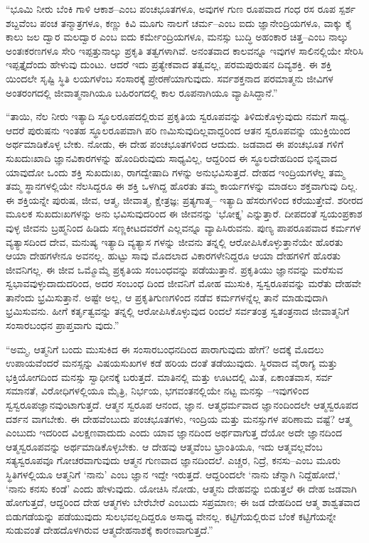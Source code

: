 “ಭೂಮಿ ನೀರು ಬೆಂಕಿ ಗಾಳಿ ಆಕಾಶ–ಎಂಬ ಪಂಚಭೂತಗಳೂ, ಅವುಗಳ ಗುಣ ರೂಪವಾದ ಗಂಧ ರಸ ರೂಪ ಸ್ಪರ್ಶ ಶಬ್ದವೆಂಬ ಪಂಚ ತನ್ಮಾತ್ರಗಳೂ, ಕಣ್ಣು ಕಿವಿ ಮೂಗು ನಾಲಗೆ ಚರ್ಮ–ಎಂಬ ಐದು ಜ್ಞಾನೇಂದ್ರಿಯಗಳೂ, ವಾಕ್ಕು ಕೈ ಕಾಲು ಜಲ ದ್ವಾರ ಮಲದ್ವಾರ ಎಂಬ ಐದು ಕರ್ಮೇಂದ್ರಿಯಗಳೂ, ಮನಸ್ಸು ಬುದ್ಧಿ ಅಹಂಕಾರ ಚಿತ್ತ–ಎಂಬ ನಾಲ್ಕು ಅಂತಃಕರಣಗಳೂ ಸೇರಿ ಇಪ್ಪತ್ತುನಾಲ್ಕು ಪ್ರಕೃತಿ ತತ್ವಗಳಾಗಿವೆ. ಅನಂತವಾದ ಕಾಲವನ್ನೂ ಇವುಗಳ ಸಾಲಿನಲ್ಲಿಯೇ ಸೇರಿಸಿ ಇಪ್ಪತ್ತೈದೆಂದು ಹೇಳುವು ದುಂಟು. ಆದರೆ ಇದು ಪ್ರತ್ಯೇಕವಾದ ತತ್ವವಲ್ಲ, ಪರಮಪುರುಷನ ದಿವ್ಯಶಕ್ತಿ. ಈ ಶಕ್ತಿ ಯಿಂದಲೇ ಸೃಷ್ಟಿ ಸ್ಥಿತಿ ಲಯಗಳೆಂಬ ಸಂಸಾರಕ್ಕೆ ಪ್ರೇರಣೆಯಾಗುವುದು. ಸರ್ವಶಕ್ತನಾದ ಪರಮಾತ್ಮನು ಜೀವಿಗಳ ಅಂತರಂಗದಲ್ಲಿ ಜೀವಾತ್ಮನಾಗಿಯೂ ಬಹಿರಂಗದಲ್ಲಿ ಕಾಲ ರೂಪನಾಗಿಯೂ ವ್ಯಾಪಿಸಿದ್ದಾನೆ.”

“ತಾಯಿ, ನೆಲ ನೀರು ಇತ್ಯಾದಿ ಸ್ಥೂಲರೂಪದಲ್ಲಿರುವ ಪ್ರಕೃತಿಯ ಸ್ವರೂಪವನ್ನು ತಿಳಿದುಕೊಳ್ಳುವುದು ನಮಗೆ ಸಾಧ್ಯ. ಆದರೆ ಪುರುಷನು ಇಂತಹ ಸ್ಥೂಲರೂಪವಾಗಿ ಪರಿ ಣಮಿಸುವುದಿಲ್ಲವಾದ್ದರಿಂದ ಆತನ ಸ್ವರೂಪವನ್ನು ಯುಕ್ತಿಯಿಂದ ಅರ್ಥಮಾಡಿಕೊಳ್ಳ ಬೇಕು. ನೋಡು, ಈ ದೇಹ ಪಂಚಭೂತಗಳಿಂದ ಆದುದು. ಜಡವಾದ ಈ ಪಂಚಭೂತ ಗಳಿಗೆ ಸುಖದುಃಖಾದಿ ಜ್ಞಾನವಿಕಾರಗಳನ್ನು ಹೊಂದಿರುವುದು ಸಾಧ್ಯವಿಲ್ಲ, ಆದ್ದರಿಂದ ಈ ಸ್ಥೂಲದೇಹದಿಂದ ಭಿನ್ನವಾದ ಯಾವುದೋ ಒಂದು ಶಕ್ತಿ ಸುಖದುಃಖ, ರಾಗದ್ವೇಷಾದಿ ಗಳನ್ನು ಅನುಭವಿಸುತ್ತದೆ. ದೇಹದ ಇಂದ್ರಿಯಗಳೆಲ್ಲ ತಮ್ಮ ತಮ್ಮ ಸ್ಥಾನಗಳಲ್ಲಿಯೇ ನೆಲಸಿದ್ದರೂ ಈ ಶಕ್ತಿ ಒಳಗಿದ್ದ ಹೊರತು ತಮ್ಮ ಕಾರ್ಯಗಳನ್ನು ಮಾಡಲು ಶಕ್ತವಾಗುವು ದಿಲ್ಲ. ಈ ಶಕ್ತಿಯನ್ನೇ ಪುರುಷ, ಜೀವ, ಆತ್ಮ, ಜೀವಾತ್ಮ, ಕ್ಷೇತ್ರಜ್ಞ; ಪ್ರತ್ಯಗಾತ್ಮ– ಇತ್ಯಾದಿ ಹೆಸರುಗಳಿಂದ ಕರೆಯುತ್ತೇವೆ. ಶರೀರದ ಮೂಲಕ ಸುಖದುಃಖಗಳನ್ನು ಅನು ಭವಿಸುವುದರಿಂದ ಈ ಜೀವನನ್ನು ‘ಭೋಕ್ತೃ’ ಎನ್ನುತ್ತಾರೆ. ದೀಪದಂತೆ ಸ್ವಯಂಪ್ರಕಾಶ ವುಳ್ಳ ಜೀವನು ಬ್ರಹ್ಮನಿಂದ ಹಿಡಿದು ಸಣ್ಣಕೀಟದವರೆಗೆ ಎಲ್ಲವನ್ನೂ ವ್ಯಾಪಿಸಿರುವನು. ಪುಣ್ಯ ಪಾಪರೂಪವಾದ ಕರ್ಮಗಳ ವ್ಯತ್ಯಾಸದಿಂದ ದೇವ, ಮನುಷ್ಯ ಇತ್ಯಾದಿ ವ್ಯತ್ಯಾಸ ಗಳನ್ನು ಜೀವನು ತನ್ನಲ್ಲಿ ಆರೋಪಿಸಿಕೊಳ್ಳುತ್ತಾನೆಯೇ ಹೊರತು ಆಯಾ ದೇಹಗಳೇನೂ ಅವನಲ್ಲ. ಹುಟ್ಟು ಸಾವು ಮೊದಲಾದ ವಿಕಾರಗಳೇನಿದ್ದರೂ ಆಯಾ ದೇಹಗಳಿಗೆ ಹೊರತು ಜೀವನಿಗಲ್ಲ. ಈ ಜೀವ ಒಮ್ಮೊಮ್ಮೆ ಪ್ರಕೃತಿಯ ಸಂಬಂಧವನ್ನು ಪಡೆಯುತ್ತಾನೆ. ಪ್ರಕೃತಿಯು ಜ್ಞಾನವನ್ನು ಮರೆಸುವ ಸ್ವಭಾವವುಳ್ಳುದಾದುದರಿಂದ, ಅದರ ಸಂಬಂಧ ದಿಂದ ಜೀವನಿಗೆ ಮೋಹ ಮುಸುಕಿ, ಸ್ವಸ್ವರೂಪವನ್ನು ಮರೆತು ದೇಹವೇ ತಾನೆಂದು ಭ್ರಮಿಸುತ್ತಾನೆ. ಅಷ್ಟೇ ಅಲ್ಲ, ಆ ಪ್ರಕೃತಿಗುಣಗಳಿಂದ ನಡೆವ ಕರ್ಮಗಳನ್ನೆಲ್ಲ ತಾನೆ ಮಾಡುವುದಾಗಿ ಭ್ರಮಿಸುವನು. ಹೀಗೆ ಕರ್ತೃತ್ವವನ್ನು ತನ್ನಲ್ಲಿ ಆರೋಪಿಸಿಕೊಳ್ಳುವುದ ರಿಂದಲೆ ಸರ್ವತಂತ್ರ ಸ್ವತಂತ್ರನಾದ ಜೀವಾತ್ಮನಿಗೆ ಸಂಸಾರಬಂಧನ ಪ್ರಾಪ್ತವಾಗು ವುದು.”

“ಅಮ್ಮ, ಆತ್ಮನಿಗೆ ಬಂದು ಮುಸುಕಿದ ಈ ಸಂಸಾರಬಂಧನದಿಂದ ಪಾರಾಗುವುದು ಹೇಗೆ? ಅದಕ್ಕೆ ಮೊದಲು ಉಪಾಯವೆಂದರೆ ಮನಸ್ಸನ್ನು ವಿಷಯಸುಖಗಳ ಕಡೆ ಹರಿಯ ದಂತೆ ತಡೆಯುವುದು. ಸ್ಥಿರವಾದ ವೈರಾಗ್ಯ ಮತ್ತು ಭಕ್ತಿಯೋಗದಿಂದ ಮನಸ್ಸು ಸ್ವಾಧೀನಕ್ಕೆ ಬರುತ್ತದೆ. ಮಾತಿನಲ್ಲಿ ಮತ್ತು ಊಟದಲ್ಲಿ ಮಿತ, ಏಕಾಂತವಾಸ, ಸರ್ವ ಸಮಾನತೆ, ವಿರೋಧಿಗಳಲ್ಲಿಯೂ ಮೈತ್ರಿ, ನಿರ್ಭಯ, ಭಗವಂತನಲ್ಲಿಯೇ ನಟ್ಟ ಮನಸ್ಸು –ಇವುಗಳಿಂದ ಸ್ವಸ್ವರೂಪಜ್ಞಾನವುಂಟಾಗುತ್ತದೆ. ಆತ್ಮನ ಸ್ವರೂಪ ಆನಂದ, ಜ್ಞಾನ. ಆತ್ಮಧರ್ಮವಾದ ಜ್ಞಾನಂದಿಂದಲೇ ಆತ್ಮಸ್ವರೂಪದ ದರ್ಶನ ವಾಗಬೇಕು. ಈ ದೇಹವೆಂಬುದು ಪಂಚಭೂತಗಳು, ಇಂದ್ರಿಯ ಮತ್ತು ಮನಸ್ಸುಗಳ ಪರಿಣಾಮ ವಷ್ಟೆ? ಆತ್ಮ ಎಂಬುದು ಇದರಿಂದ ವಿಲಕ್ಷಣವಾದುದು ಎಂದು ಯಾವ ಜ್ಞಾನದಿಂದ ಅರ್ಥವಾಗುತ್ತ ದೆಯೋ ಅದೇ ಜ್ಞಾನದಿಂದ ಆತ್ಮಸ್ವರೂಪವನ್ನು ಅರ್ಥಮಾಡಿಕೊಳ್ಳಬೇಕು. ಆ ದೇಹವು ಆತ್ಮವೆಂಬ ಭ್ರಾಂತಿಯೂ, ಇದು ಆತ್ಮವಲ್ಲವೆಂಬ ಸತ್ಯಸ್ವರೂಪವೂ ಗೋಚರವಾಗುವುದು ಆತ್ಮನ ಗುಣವಾದ ಜ್ಞಾನದಿಂದಲೆ. ಎಚ್ಚರ, ನಿದ್ರೆ, ಕನಸು–ಎಂಬ ಮೂರು ಸ್ಥಿತಿಗಳಲ್ಲಿಯೂ ಆತ್ಮನಿಗೆ ‘ನಾನು’ ಎಂಬ ಜ್ಞಾನ ಇದ್ದೇ ಇರುತ್ತದೆ. ಆದ್ದರಿಂದಲೇ ‘ನಾನು ಚೆನ್ನಾಗಿ ನಿದ್ದೆಹೋದೆ,‘ ‘ನಾನು ಕನಸು ಕಂಡೆ’ ಎಂದು ಹೇಳುವುದು. ಯೋಚಿಸಿ ನೋಡು, ಆತ್ಮನು ದೇಹವನ್ನು ಬಿಡುತ್ತಲೆ ಈ ದೇಹ ಜಡವಾಗಿ ಹೋಗುತ್ತದೆ, ಆದ್ದರಿಂದ ದೇಹ ಆತ್ಮಗಳು ಬೇರೆಬೇರೆ ಎಂಬುದು ಸಪ್ರಮಾಣ; ಈ ಜಡ ದೇಹದಿಂದ ಆತ್ಮ ಶಾಶ್ವತವಾದ ಬಿಡುಗಡೆಯನ್ನು ಪಡೆಯುವುದು ಸುಲಭವಲ್ಲದಿದ್ದರೂ ಅಸಾಧ್ಯ ವೇನಲ್ಲ. ಕಟ್ಟಿಗೆಯಲ್ಲಿರುವ ಬೆಂಕೆ ಕಟ್ಟಿಗೆಯನ್ನೇ ಸುಡುವಂತೆ ದೇಹದೊಳಗಿರುವ ಆತ್ಮದೇಹನಾಶಕ್ಕೆ ಕಾರಣವಾಗುತ್ತದೆ.”

